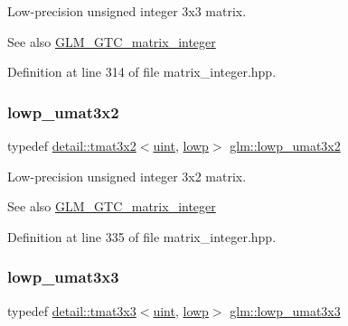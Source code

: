 Low-\/precision unsigned integer 3x3 matrix. \begin{DoxySeeAlso}{See also}
\hyperlink{group__gtc__matrix__integer}{G\+L\+M\+\_\+\+G\+T\+C\+\_\+matrix\+\_\+integer} 
\end{DoxySeeAlso}


Definition at line 314 of file matrix\+\_\+integer.\+hpp.

\mbox{\label{group__gtc__matrix__integer_ga5874e964b1816f230215df28d22ea7de}} 
\subsubsection{\texorpdfstring{lowp\+\_\+umat3x2}{lowp\_umat3x2}}
{\footnotesize\ttfamily typedef \hyperlink{structglm_1_1detail_1_1tmat3x2}{detail\+::tmat3x2}$<$\hyperlink{group__core__precision_ga4fd29415871152bfb5abd588334147c8}{uint}, \hyperlink{namespaceglm_a0f04f086094c747d227af4425893f545ae161af3fc695e696ce3bf69f7332bc2d}{lowp}$>$ \hyperlink{group__gtc__matrix__integer_ga5874e964b1816f230215df28d22ea7de}{glm\+::lowp\+\_\+umat3x2}}

Low-\/precision unsigned integer 3x2 matrix. \begin{DoxySeeAlso}{See also}
\hyperlink{group__gtc__matrix__integer}{G\+L\+M\+\_\+\+G\+T\+C\+\_\+matrix\+\_\+integer} 
\end{DoxySeeAlso}


Definition at line 335 of file matrix\+\_\+integer.\+hpp.

\mbox{\label{group__gtc__matrix__integer_ga691694b1a4c6d1e613d8f1f707acc829}} 
\subsubsection{\texorpdfstring{lowp\+\_\+umat3x3}{lowp\_umat3x3}}
{\footnotesize\ttfamily typedef \hyperlink{structglm_1_1detail_1_1tmat3x3}{detail\+::tmat3x3}$<$\hyperlink{group__core__precision_ga4fd29415871152bfb5abd588334147c8}{uint}, \hyperlink{namespaceglm_a0f04f086094c747d227af4425893f545ae161af3fc695e696ce3bf69f7332bc2d}{lowp}$>$ \hyperlink{group__gtc__matrix__integer_ga691694b1a4c6d1e613d8f1f707acc829}{glm\+::lowp\+\_\+umat3x3}}

